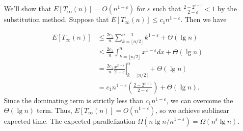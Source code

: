 \documentclass{article}
\begin{document}
We'll show that $E[T_\infty(n)] = O(n^{1-\varepsilon})$ for $\varepsilon$ such that $\frac{2-2^{\varepsilon - 1}}{2 - \varepsilon} < 1$ by the substitution method.  Suppose that $E[T_\infty(n)] \leq c_1n^{1-\varepsilon}$.  Then we have

\begin{align*}
E[T_\infty(n)] &\leq  \frac{2c_1}{n}\sum_{k=\lfloor n/2 \rfloor}^{n-1} k^{1-\varepsilon} + \Theta(\lg n) \\
& \leq  \frac{2c_1}{n}\int_{k=\lfloor n/2 \rfloor}^{n}x^{1-\varepsilon}dx + \Theta(\lg n) \\
&= \frac{2c_1}{n}\left. \frac{x^{2-\varepsilon}}{2-\varepsilon}\right|_{k=\lfloor n/2 \rfloor}^{n} + \Theta(\lg n) \\
&= c_1n^{1 - \varepsilon} \left( \frac{2-2^{\varepsilon - 1}}{2 - \varepsilon} \right) + \Theta(\lg n).
\end{align*}
Since the dominating term is strictly less than $c_1n^{1-\varepsilon}$, we can overcome the $\Theta(\lg n)$ term. Thus, $E[T_\infty(n)] = O(n^{1-\varepsilon})$, so we achieve sublinear expected time. The expected parallelization $\Omega(n \lg n / n^{1-\varepsilon}) = \Omega(n^{\varepsilon} \lg n)$. 
\end{document}
